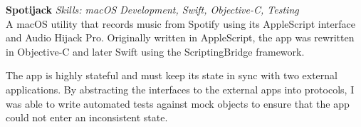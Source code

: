 \textbf{Spotijack}  \newline
\textit{Skills: macOS Development, Swift, Objective-C, Testing}\\
A macOS utility that records music from Spotify using its AppleScript interface
and Audio Hijack Pro. Originally written in AppleScript, the app was rewritten
in Objective-C and later Swift using the ScriptingBridge framework.

The app is highly stateful and must keep its state in sync with two external
applications. By abstracting the interfaces to the external apps into protocols,
I was able to write automated tests against mock objects to ensure that the app
could not enter an inconsistent state.

